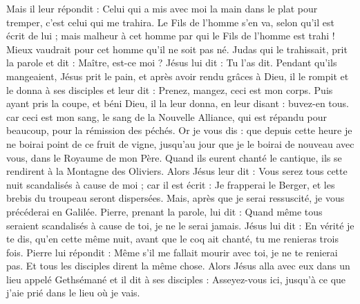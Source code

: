 \begin{multicols}{2}
Mais il leur répondit : Celui qui a mis avec moi la main dans le plat pour tremper, c'est celui qui me trahira.
Le Fils de l'homme s'en va, selon qu'il est écrit de lui ; mais malheur à cet homme par qui le Fils de l'homme est trahi ! Mieux vaudrait pour cet homme qu'il ne soit pas né.
Judas qui le trahissait, prit la parole et dit : Maître, est-ce moi ? Jésus lui dit : Tu l'as dit.
Pendant qu'ils mangeaient, Jésus prit le pain, et après avoir rendu grâces à Dieu, il le rompit et le donna à ses disciples et leur dit : Prenez, mangez, ceci est mon corps.
Puis ayant pris la coupe, et béni Dieu, il la leur donna, en leur disant : buvez-en tous.
car ceci est mon sang, le sang de la Nouvelle Alliance, qui est répandu pour beaucoup, pour la rémission des péchés.
Or je vous dis : que depuis cette heure je ne boirai point de ce fruit de vigne, jusqu'au jour que je le boirai de nouveau avec vous, dans le Royaume de mon Père.
Quand ils eurent chanté le cantique, ils se rendirent à la Montagne des Oliviers.
Alors Jésus leur dit : Vous serez tous cette nuit scandalisés à cause de moi ; car il est écrit : Je frapperai le Berger, et les brebis du troupeau seront dispersées.
Mais, après que je serai ressuscité, je vous précéderai en Galilée.
Pierre, prenant la parole, lui dit : Quand même tous seraient scandalisés à cause de toi, je ne le serai jamais.
Jésus lui dit : En vérité je te dis, qu'en cette même nuit, avant que le coq ait chanté, tu me renieras trois fois.
Pierre lui répondit : Même s'il me fallait mourir avec toi, je ne te renierai pas. Et tous les disciples dirent la même chose.
Alors Jésus alla avec eux dans un lieu appelé Gethsémané et il dit à ses disciples : Asseyez-vous ici, jusqu'à ce que j'aie prié dans le lieu où je vais.

\end{multicols}
